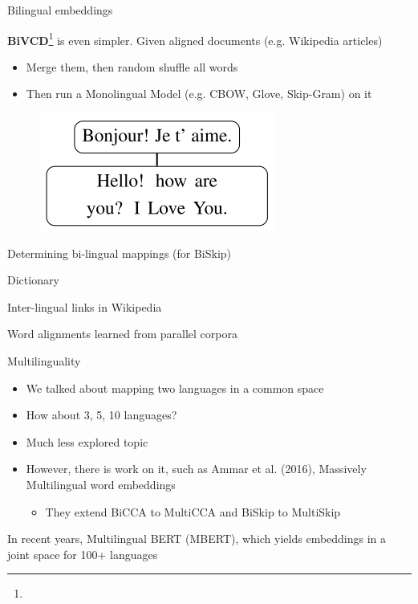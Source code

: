 \documentclass[12pt]{beamer}
\begin{document}
\begin{frame}{Bilingual embeddings}
	
	\textbf{BiVCD}\footnote{} is even simpler. Given aligned documents (e.g. Wikipedia articles)
	
	\begin{itemize}
		\item Merge them, then random shuffle all words
		\item Then run a Monolingual Model (e.g. CBOW, Glove, Skip-Gram) on it
	\end{itemize}
	
	
	\begin{figure}
		\includegraphics[width=0.3\linewidth]{img/bivcd.png}
	\end{figure}
\end{frame}


\begin{frame}{Determining bi-lingual mappings (for BiSkip)}
	
Dictionary

Inter-lingual links in Wikipedia

Word alignments learned from parallel corpora
	
\end{frame}


\begin{frame}{Multilinguality}

\begin{itemize}
	\item  We talked about mapping two languages in a common space
	\item How about 3, 5, 10 languages?
	\item Much less explored topic
	\item However, there is work on it, such as Ammar et al. (2016), Massively Multilingual word embeddings
	\begin{itemize}
		\item They extend BiCCA to MultiCCA and BiSkip to MultiSkip 
	\end{itemize}
\end{itemize}

In recent years, Multilingual BERT (MBERT), which yields embeddings in a joint space for 100+ languages

\end{frame}
\end{document}
